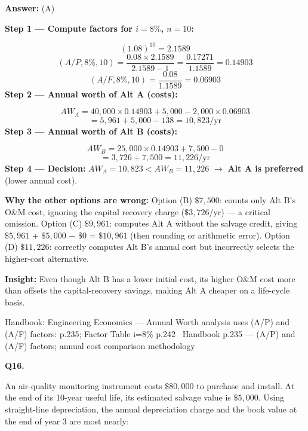 \documentclass[11pt]{article}
\begin{document}
\vspace{2pt}\par\noindent\colorbox{boxbg}{\parbox{\dimexpr\linewidth-2\fboxsep\relax}{%
\vspace{2pt}\textbf{Answer:} (A)\par\vspace{2pt}
{\small \textbf{Step 1 --- Compute factors for $i = 8\%$, $n = 10$:}\par
\[(1.08)^{10} = 2.1589\]
\[(A/P, 8\%, 10) = \frac{0.08 \times 2.1589}{2.1589 - 1} = \frac{0.17271}{1.1589} = 0.14903\]
\[(A/F, 8\%, 10) = \frac{0.08}{1.1589} = 0.06903\]
\textbf{Step 2 --- Annual worth of Alt A (costs):}\par
\[AW_A = 40{,}000 \times 0.14903 + 5{,}000 - 2{,}000 \times 0.06903\]
\[= 5{,}961 + 5{,}000 - 138 = 10{,}823/\text{yr}\]
\textbf{Step 3 --- Annual worth of Alt B (costs):}\par
\[AW_B = 25{,}000 \times 0.14903 + 7{,}500 - 0\]
\[= 3{,}726 + 7{,}500 = 11{,}226/\text{yr}\]
\textbf{Step 4 --- Decision:} $AW_A = 10{,}823 < AW_B = 11{,}226$ $\rightarrow$ \textbf{Alt A is preferred} (lower annual cost).\par
\textbf{Why the other options are wrong:} Option (B) $\$7{,}500$: counts only Alt B's O\&M cost, ignoring the capital recovery charge ($\$3{,}726$/yr) --- a critical omission. Option (C) $\$9{,}961$: computes Alt A without the salvage credit, giving $\$5{,}961$ + $\$5{,}000$ $-$ $\$0$ = $\$10{,}961$ (then rounding or arithmetic error). Option (D) $\$11{,}226$: correctly computes Alt B's annual cost but incorrectly selects the higher-cost alternative.\par
\textbf{Insight:} Even though Alt B has a lower initial cost, its higher O\&M cost more than offsets the capital-recovery savings, making Alt A cheaper on a life-cycle basis.\par}\par\vspace{2pt}
{\footnotesize\color{soft}Handbook: Engineering Economics --- Annual Worth analysis uses (A/P) and (A/F) factors: p.235; Factor Table i=8\% p.242 \textbullet\ Handbook p.235 --- (A/P) and (A/F) factors; annual cost comparison methodology}\vspace{2pt}
}}
\vspace{9pt}
\filbreak
\textbf{\color{accent}Q16.}\par\vspace{2pt}
An air-quality monitoring instrument costs $\$80{,}000$ to purchase and install. At the end of its 10-year useful life, its estimated salvage value is $\$5{,}000$. Using straight-line depreciation, the annual depreciation charge and the book value at the end of year 3 are most nearly:\par\par\vspace{3pt}
\end{document}
